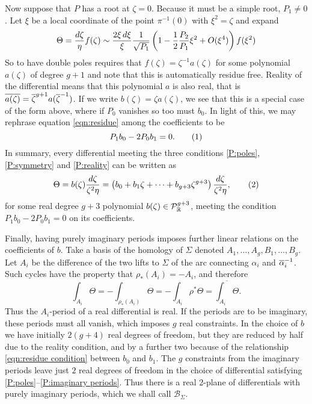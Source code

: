\documentclass{article}
\begin{document}
Now suppose that $P$ has a root at $\zeta=0$. Because it must be a simple root, $P_1 \neq 0$. Let $\xi$ be a local coordinate of the point $\pi^{-1}(0)$ with $\xi^2 = \zeta$ and expand
\[
\Theta = \frac{d\zeta}{\eta}f(\zeta)
\sim \frac{2\xi\, d\xi}{\xi} \frac{1}{\sqrt{P_1}} \left(1-\frac{1}{2}\frac{P_2}{P_1}\xi^2+O(\xi^4)\right) f(\xi^2)
\]
So to have double poles requires that $f(\zeta) = \zeta^{-1}a(\zeta)$ for some polynomial $a(\zeta)$ of degree $g+1$ and note that this is automatically residue free. Reality of the differential means that this polynomial $a$ is also real, that is $\overline{a(\zeta)}=\overline{\zeta}^{g+1}a(\overline{\zeta}^{-1})$. If we write $b(\zeta) = \zeta a(\zeta)$, we see that this is a special case of the form above, where if $P_0$ vanishes so too must $b_0$. In light of this, we may rephrase equation \ref{eqn:residue} among the coefficients to be
\[
P_1b_0 - 2P_0b_1 = 0.
\labelthis{eqn:residue condition}
\]
In summary, every differential meeting the three conditions \ref{P:poles}, \ref{P:symmetry} and \ref{P:reality} can be written as
\[
\Theta = b(\zeta)\frac{d\zeta}{\zeta^2\eta} = \left( b_0 + b_1 \zeta + \dots + b_{g+3} \zeta^{g+3} \right) \frac{d\zeta}{\zeta^2\eta},
\labelthis{eqn:def b}
\]
for some real degree $g+3$ polynomial $b(\zeta) \in \mathcal{P}^{g+3}_{\mathbb{R}}$, meeting the condition $P_1b_0 - 2P_0b_1 = 0$ on its coefficients.

Finally, having purely imaginary periods imposes further linear relations on the coefficients of $b$. Take a basis of the homology of $\Sigma$ denoted $A_1,\ldots,A_g,B_1,\ldots,B_g$. Let $A_i$ be the difference of the two lifts to $\Sigma$ of the arc connecting $\alpha_i$ and $\overline{\alpha}^{-1}_i$. Such cycles have the property that $\rho_*(A_i) = -A_i$, and therefore
\[
\int_{A_i} \Theta
= - \int_{\rho_*(A_i)} \Theta
= - \int_{A_i} \rho^* \Theta
= \overline{ \int_{A_i} \Theta }.
\]
Thus the $A_i$-period of a real differential is real. If the periods are to be imaginary, these periods must all vanish, which imposes $g$ real constraints. In the choice of $b$ we have initially $2(g+4)$ real degrees of freedom, but they are reduced by half due to the reality condition, and by a further two because of the relationship \eqref{eqn:residue condition} between $b_0$ and $b_1$. The $g$ constraints from the imaginary periods leave just $2$ real degrees of freedom in the choice of differential satisfying \ref{P:poles}--\ref{P:imaginary periods}. Thus there is a real 2-plane of differentials with purely imaginary periods, which we shall call $\mathcal{B}_\Sigma$.
\end{document}
